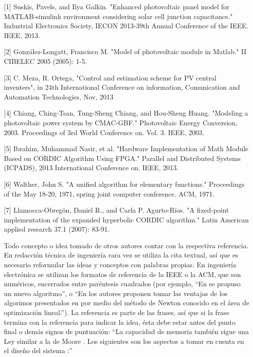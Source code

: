 [1] Suskis, Pavels, and Ilya Galkin. "Enhanced photovoltaic panel model for MATLAB-simulink environment considering solar cell junction capacitance." Industrial Electronics Society, IECON 2013-39th Annual Conference of the IEEE. IEEE, 2013.

[2] González-Longatt, Francisco M. "Model of photovoltaic module in Matlab." II CIBELEC 2005 (2005): 1-5.

[3] C. Meza, R. Ortega, "Control and estimation scheme for PV central inventers", in 24th International Conference on information, Comunication and Automation Technologies, Nov, 2013 

[4] Chiang, Ching-Tsan, Tung-Sheng Chiang, and Hou-Sheng Huang. "Modeling a photovoltaic power system by CMAC-GBF." Photovoltaic Energy Conversion, 2003. Proceedings of 3rd World Conference on. Vol. 3. IEEE, 2003.

[5] Ibrahim, Muhammad Nasir, et al. "Hardware Implementation of Math Module Based on CORDIC Algorithm Using FPGA." Parallel and Distributed Systems (ICPADS), 2013 International Conference on. IEEE, 2013.

[6] Walther, John S. "A unified algorithm for elementary functions." Proceedings of the May 18-20, 1971, spring joint computer conference. ACM, 1971.

[7] Llamocca-Obregón, Daniel R., and Carla P. Agurto-Ríos. "A fixed-point implementation of the expanded hyperbolic CORDIC algorithm." Latin American applied research 37.1 (2007): 83-91.










Todo concepto o idea tomado de otros autores contar con la respectiva
referencia. En redacción técnica de ingeniería rara vez se utiliza la cita
textual, así que es necesario reformular las ideas y conceptos con palabras
propias. En ingeniería electrónica se utilizan los formatos de referencia de la
IEEE o la ACM, que son numéricos, encerrados entre paréntesis cuadrados (por
ejemplo, ``En \cite{Davis1963} se propuso un nuevo algoritmo'', o ``En
\cite{ProakisManolakis1998} los autores proponen tomar las ventajas de los
algorimos presentados en \cite{Oppenheim1998,Roberts2005,Haykin2001} por medio
del método de Newton \cite{Burrus1998} conocido en el área de optimización
lineal.''). La referencia es parte de las frases, así que si la frase termina
con la referencia para indicar la idea, ésta debe estar antes del punto final o
demás signos de puntuación: ``La capacidad de memoria también sigue una Ley
similar a la de Moore \cite{Octave}. Los siguientes son los aspectos a tomar en
cuenta en el diseño del sistema \cite{Lindner2002}:''

